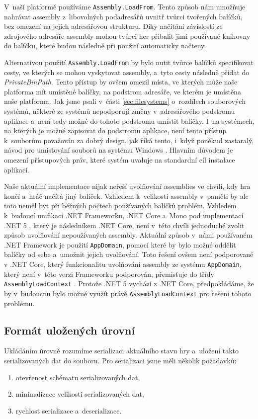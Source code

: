 V~naší platformě používáme \texttt{Assembly.LoadFrom}. Tento způsob nám umožňuje nahrávat assembly z~libovolných podadresářů uvnitř tvůrci tvořených balíčků, bez omezení na jejich adresářovou strukturu. Díky načítání závislostí ze zdrojového adresáře assembly mohou tvůrci her přibalit jimi používané knihovny do balíčku, které budou následně při použití automaticky načteny.

Alternativou použití \texttt{Assembly.LoadFrom} by bylo nutit tvůrce balíčků specifikovat cesty, ve kterých se mohou vyskytovat assembly, a~tyto cesty následně přidat do \textit{PrivateBinPath}. Tento přístup by ovšem omezil místa, ve kterých může naše platforma mít umístěné balíčky, na podstrom adresáře, ve kterém je umístěna naše platforma. Jak jsme psali v~části \ref{sec:filesystems} o~rozdílech souborových systémů, některé ze systémů nepodporují změny v~adresářového podstromu aplikace a~není tedy možné do tohoto podstromu umístit balíčky. I~na systémech, na kterých je možné zapisovat do podstromu aplikace, není tento přístup k~souborům považován za dobrý design, jak říká tento, i~když poněkud zastaralý, návod pro umisťování souborů na systému Windows \citep{site:windowsappfiles}. Hlavním důvodem je omezení přístupových práv, které systém uvaluje na standardní cíl instalace aplikací.

Naše aktuální implementace nijak neřeší uvolňování assemblies ve chvíli, kdy hra končí a~hráč načítá jiný balíček. Vzhledem k~velikosti assembly v~paměti by ale toto neměl být při běžných počtech používaných balíčků problém. Vzhledem k~budoucí unifikaci .NET Frameworku, .NET Core a~Mono pod implementací .NET 5 \citep{site:dotnet5}, který je následníkem .NET Core, není v~této chvíli jednoduché zvolit způsob uvolňování nepoužívaných assembly. Aktuální způsob v~námi používaném .NET Framework je použití \texttt{AppDomain}, pomocí které by bylo možné oddělit balíčky od sebe a~umožnit jejich uvolňování. Toto řešení ovšem není podporované v .NET Core, který funkcionalitu uvolňování assembly ze systému \texttt{AppDomain}, který není v~této verzi Frameworku podporován, přemisťuje do třídy \texttt{AssemblyLoadContext} \citep{site:assloadcontext}. Protože .NET 5 vychází z .NET Core, předpokládáme, že by v~budoucnu bylo možné využít právě \texttt{AssemblyLoadContext} pro řešení tohoto problému. 

\subsection{Formát uložených úrovní}
\label{sec:savingformat}
Ukládáním úrovně rozumíme serializaci aktuálního stavu hry a~uložení takto serializovaných dat do souboru. Pro serializaci jsme měli několik požadavků: 
\begin{enumerate}
	\item otevřenost schématu serializovaných dat,
	\item minimalizace velikosti serializovaných dat,
	\item rychlost serializace a~deserializace.
\end{enumerate}

